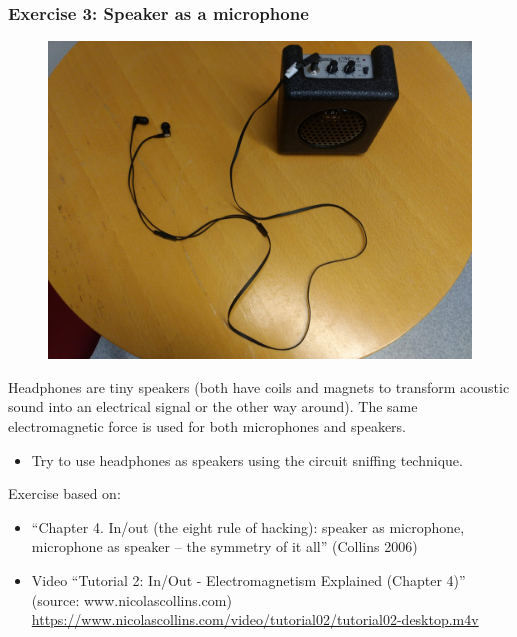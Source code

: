 \documentclass[screen, aspectratio=43]{beamer}
\begin{document}
\begin{frame}
  \frametitle{Exercise 3: Speaker as a microphone}
 \begin{figure}
	\includegraphics[scale=0.05]{img/coilsamps.jpg}
\end{figure}
{\scriptsize 
Headphones are tiny speakers (both have coils and magnets to transform acoustic sound into an electrical signal or the other way around). The same electromagnetic force is used for both microphones and speakers.
    \begin{itemize}
	\item Try to use headphones as speakers using the circuit sniffing technique.    
    \end{itemize}
 }   
    {\tiny Exercise based on:
     \begin{itemize}
    	\item ``Chapter 4. In/out (the eight rule of hacking): speaker as microphone, microphone as speaker -- the symmetry of it all'' (Collins 2006)
	\item Video ``Tutorial 2: In/Out - Electromagnetism Explained (Chapter 4)'' (source: www.nicolascollins.com)\\ 
	\url{https://www.nicolascollins.com/video/tutorial02/tutorial02-desktop.m4v} 
      \end{itemize}	
    }
       
\end{frame}

%
\end{document}
